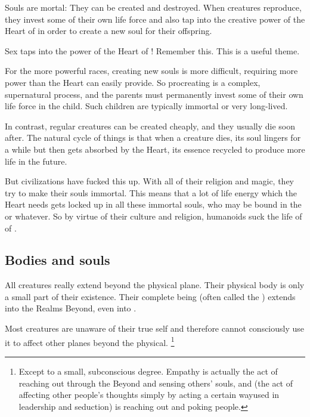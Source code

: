 Souls are mortal: They can be created and destroyed. When \Miithian{} creatures reproduce, they invest some of their own life force and also tap into the creative power of the Heart of \Miith{} in order to create a new soul for their offspring. 

Sex taps into the power of the Heart of \Miith{}! Remember this. This is a useful theme. 

For the more powerful races, creating new souls is more difficult, requiring more power than the Heart can easily provide. So procreating is a complex, supernatural process, and the parents must permanently invest some of their own life force in the child. Such children are typically immortal or very long-lived. 

In contrast, regular creatures can be created cheaply, and they usually die soon after. The natural cycle of things is that when a creature dies, its soul lingers for a while but then gets absorbed by the Heart, its essence recycled to produce more life in the future. 

But civilizations have fucked this up. With all of their religion and magic, they try to make their souls immortal. This means that a lot of life energy which the Heart needs gets locked up in all these immortal souls, who may be bound in the \Sephiroth{} or whatever. So by virtue of their culture and religion, humanoids suck the life of of \Miith{}. 









\subsection{Bodies and souls}
All creatures really extend beyond the physical plane. 
Their physical body is only a small part of their existence. 
Their complete being (often called the ) extends into the Realms Beyond, even into . 


Most creatures are unaware of their true self and therefore cannot consciously use it to affect other planes beyond the physical.%
\footnote{%
  Except to a small, subconscious degree. 
  Empathy is actually the act of reaching out through the Beyond and sensing others' souls, and  (the act of affecting other people's thoughts simply by acting a certain way\dash used in leadership and seduction) is reaching out and poking people.} 

